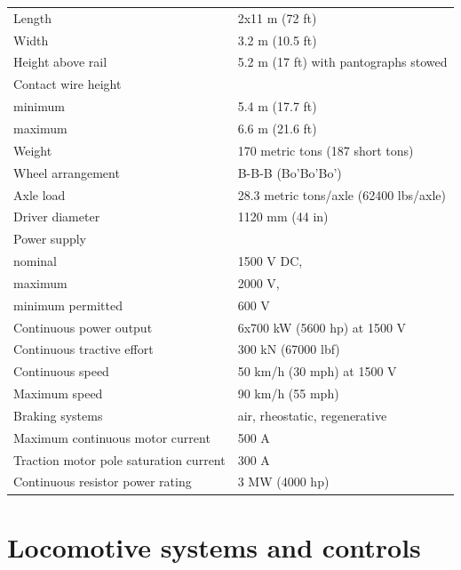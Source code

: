 \documentclass[11pt, a4paper]{article}
\begin{document}
\begin{tabular}{@{}p{75mm}p{75mm}@{}}
Length & 2x11 m (72 ft)\\
Width & 3.2 m (10.5 ft)\\
Height above rail & 5.2 m (17 ft) with pantographs stowed\\
Contact wire height & \\
\hspace{15mm}minimum & 5.4 m (17.7 ft)\\
\hspace{15mm}maximum & 6.6 m (21.6 ft)\\
Weight & 170 metric tons (187 short tons)\\
Wheel arrangement & B-B-B (Bo'Bo'Bo')\\
Axle load & 28.3 metric tons/axle (62400 lbs/axle)\\
Driver diameter & 1120 mm (44 in)\\
Power supply & \\
\hspace{15mm}nominal & 1500 V DC,\\
\hspace{15mm}maximum & 2000 V,\\
\hspace{15mm}minimum permitted & 600 V\footnotemark\\
Continuous power output & 6x700 kW (5600 hp) at 1500 V\\
Continuous tractive effort & 300 kN (67000 lbf)\\
Continuous speed & 50 km/h (30 mph) at 1500 V\\
Maximum speed & 90 km/h (55 mph)\\
Braking systems & air, rheostatic, regenerative\\
Maximum continuous motor current & 500 A\\
Traction motor pole saturation current & 300 A\\
Continuous resistor power rating & 3 MW (4000 hp)\\
\end{tabular}
\newpage

\section{Locomotive systems and controls}
\end{document}
